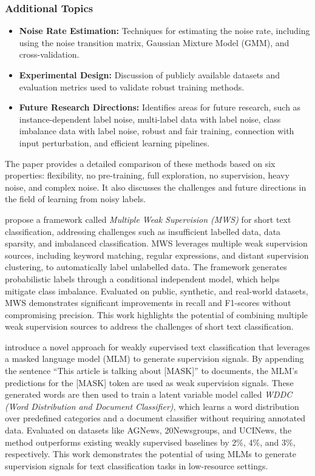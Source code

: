 \subsubsection*{Additional Topics}
\begin{itemize}
    \item \textbf{Noise Rate Estimation:} Techniques for estimating the noise rate, including using the noise transition matrix, Gaussian Mixture Model (GMM), and cross-validation.
    \item \textbf{Experimental Design:} Discussion of publicly available datasets and evaluation metrics used to validate robust training methods.
    \item \textbf{Future Research Directions:} Identifies areas for future research, such as instance-dependent label noise, multi-label data with label noise, class imbalance data with label noise, robust and fair training, connection with input perturbation, and efficient learning pipelines.
\end{itemize}

The paper provides a detailed comparison of these methods based on six properties: flexibility, no pre-training, full exploration, no supervision, heavy noise, and complex noise. It also discusses the challenges and future directions in the field of learning from noisy labels.
\newline

\citet{chen_multiple_2022} propose a framework called \emph{Multiple Weak Supervision (MWS)} for short text classification, addressing challenges such as insufficient labelled data, data sparsity, and imbalanced classification. MWS leverages multiple weak supervision sources, including keyword matching, regular expressions, and distant supervision clustering, to automatically label unlabelled data. The framework generates probabilistic labels through a conditional independent model, which helps mitigate class imbalance. Evaluated on public, synthetic, and real-world datasets, MWS demonstrates significant improvements in recall and F1-scores without compromising precision. This work highlights the potential of combining multiple weak supervision sources to address the challenges of short text classification.
\newline

\citet{zeng_weakly_2022} introduce a novel approach for weakly supervised text classification that leverages a masked language model (MLM) to generate supervision signals. By appending the sentence ``This article is talking about [MASK]'' to documents, the MLM's predictions for the [MASK] token are used as weak supervision signals. These generated words are then used to train a latent variable model called \emph{WDDC (Word Distribution and Document Classifier)}, which learns a word distribution over predefined categories and a document classifier without requiring annotated data. Evaluated on datasets like AGNews, 20Newsgroups, and UCINews, the method outperforms existing weakly supervised baselines by 2\%, 4\%, and 3\%, respectively. This work demonstrates the potential of using MLMs to generate supervision signals for text classification tasks in low-resource settings.
\newline

